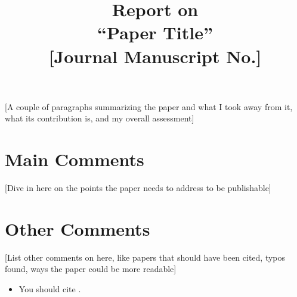 \documentclass[12pt]{article}
\begin{document}
\title{\textbf{Report on }\\
\textbf{``Paper Title''}\\
{[}Journal Manuscript No.{]}}
\author{}
\date{}

\maketitle

{[}A couple of paragraphs summarizing the paper and what I took away from it, what its contribution is, and my overall assessment{]}

\section*{Main Comments}

[Dive in here on the points the paper needs to address to be publishable]

\section*{Other Comments}
[List other comments on here, like papers that should have been cited, typos found, ways the paper could be more readable]
\begin{itemize}
    \item You should cite \citet{acemoglu_al2001}.
\end{itemize}



\end{document}
